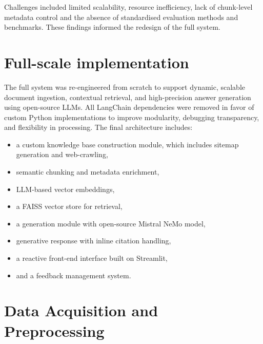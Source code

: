 \begin{spacing}{1.5}
Challenges included limited scalability, resource inefficiency, lack of chunk-level metadata control and the absence of standardised
evaluation methods and benchmarks. These findings informed the redesign of the full system.

\section{Full-scale implementation}
The full system was re-engineered from scratch to support dynamic, scalable document ingestion, contextual retrieval, and high-precision answer generation using open-source LLMs. All LangChain dependencies were removed in favor of custom Python implementations to improve modularity, debugging transparency, and flexibility in processing. The final architecture includes:
\begin{itemize}
      \item a custom knowledge base construction module, which includes sitemap generation and web-crawling,
      \item semantic chunking and metadata enrichment,
      \item LLM-based vector embeddings,
      \item a FAISS vector store for retrieval,
      \item a generation module with open-source Mistral NeMo model,
      \item generative response with inline citation handling,
      \item a reactive front-end interface built on Streamlit,
      \item and a feedback management system.
\end{itemize}

\sloppy
\section{Data Acquisition and Preprocessing}

\end{spacing}
